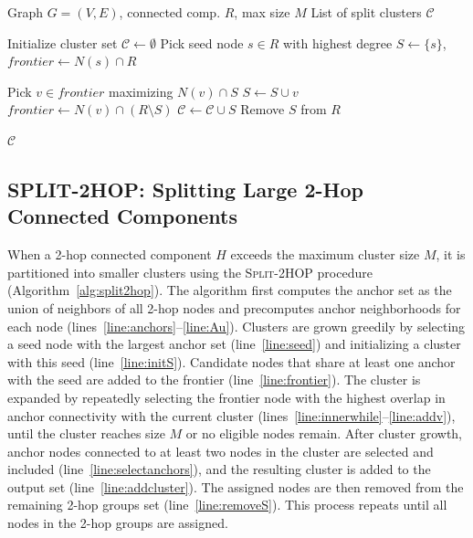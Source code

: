 \begin{algorithm}[!h]
\caption{\textsc{Split} (G, R, M)}
\label{alg:split_cc}
\begin{algorithmic}[1]
\REQUIRE Graph $G=(V,E)$, connected comp. $R$, max size $M$
\ENSURE List of split clusters $\mathcal{C}$

\STATE Initialize cluster set $\mathcal{C} \gets \emptyset$
    \STATE Pick seed node $s \in R$ with highest degree \label{line:pick_seed}
    \STATE $S \gets \{s\}$, $frontier \gets N(s) \cap R$
    
        \STATE Pick $v \in frontier$ maximizing $N(v) \cap S$ \label{line:add_best_node}
        \STATE $S \gets S \cup v$
        \STATE $frontier \gets N(v) \cap (R \setminus S)$
    \ENDWHILE
        \STATE $\mathcal{C} \gets \mathcal{C} \cup S $  \label{line:update_cluster}
    \STATE Remove $S$ from $R$ \label{line:remove_set}
\ENDWHILE

\RETURN $\mathcal{C}$
\end{algorithmic}
\end{algorithm}


\FloatBarrier


\subsection{SPLIT-2HOP: Splitting Large 2-Hop Connected Components}
\label{sec:split2hop}

When a 2-hop connected component $H$ exceeds the maximum cluster size $M$, it is partitioned into smaller clusters using the \textsc{Split-2HOP} procedure (Algorithm~\ref{alg:split2hop}). The algorithm first computes the anchor set as the union of neighbors of all 2-hop nodes and precomputes anchor neighborhoods for each node (lines~\ref{line:anchors}--\ref{line:Au}).  
Clusters are grown greedily by selecting a seed node with the largest anchor set (line~\ref{line:seed}) and initializing a cluster with this seed (line~\ref{line:initS}). Candidate nodes that share at least one anchor with the seed are added to the frontier (line~\ref{line:frontier}). The cluster is expanded by repeatedly selecting the frontier node with the highest overlap in anchor connectivity with the current cluster (lines~\ref{line:innerwhile}--\ref{line:addv}), until the cluster reaches size $M$ or no eligible nodes remain.  
After cluster growth, anchor nodes connected to at least two nodes in the cluster are selected and included (line~\ref{line:selectanchors}), and the resulting cluster is added to the output set (line~\ref{line:addcluster}). The assigned nodes are then removed from the remaining 2-hop groups set (line~\ref{line:removeS}). This process repeats until all nodes in the 2-hop groups are assigned.


